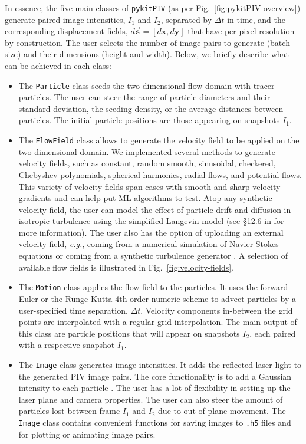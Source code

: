 \documentclass[a4paper,fleqn]{cas-dc}
\begin{document}
In essence, the five main classes of \texttt{pykitPIV} (as per Fig.~\ref{fig:pykitPIV-overview}) generate paired image intensities, $I_1$ and $I_2$, separated by $\Delta t$ in time, and the corresponding displacement fields, $d\vec{\mathbf{s}} = [d \mathbf{x}, d\mathbf{y}]$ that have per-pixel resolution by construction. The user selects the number of image pairs to generate (batch size) and their dimensions (height and width). Below, we briefly describe what can be achieved in each class:
\begin{itemize}
\item The \texttt{Particle} class seeds the two-dimensional flow domain with tracer particles. The user can steer the range of particle diameters and their standard deviation, the seeding density, or the average distances between particles. The initial particle positions are those appearing on snapshots $I_1$. \\
\item The \texttt{FlowField} class allows to generate the velocity field to be applied on the two-dimensional domain. We implemented several methods to generate velocity fields, such as constant, random smooth, sinusoidal, checkered, Chebyshev polynomials, spherical harmonics, radial flows, and potential flows. This variety of velocity fields span cases with smooth and sharp velocity gradients and can help put ML algorithms to test. Atop any synthetic velocity field, the user can model the effect of particle drift and diffusion in isotropic turbulence using the simplified Langevin model (see \S12.6 in \cite{pope2001turbulent} for more information). The user also has the option of uploading an external velocity field, \textit{e.g.}, coming from a numerical simulation of Navier-Stokes equations or coming from a synthetic turbulence generator \citep{saad2017scalable, richards2018fast}. A selection of available flow fields is illustrated in Fig.~\ref{fig:velocity-fields}. \\
\item The \texttt{Motion} class applies the flow field to the particles. It uses the forward Euler or the Runge-Kutta 4th order numeric scheme to advect particles by a user-specified time separation, $\Delta t$. Velocity components in-between the grid points are interpolated with a regular grid interpolation. The main output of this class are particle positions that will appear on snapshots $I_2$, each paired with a respective snapshot $I_1$. \\
\item The \texttt{Image} class generates image intensities. It adds the reflected laser light to the generated PIV image pairs. The core functionality is to add a Gaussian intensity to each particle \citep{olsen2000out, rabault2017performing}. The user has a lot of flexibility in setting up the laser plane and camera properties. The user can also steer the amount of particles lost between frame $I_1$ and $I_2$ due to out-of-plane movement. The \texttt{Image} class contains convenient functions for saving images to \texttt{.h5} files and for plotting or animating image pairs. \\

\end{itemize}
\end{document}
